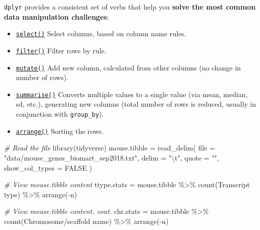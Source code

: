 \documentclass[
]{article}
\newenvironment{Shaded}{}{}
\newcommand{\AttributeTok}[1]{\textcolor[rgb]{0.49,0.56,0.16}{#1}}
\newcommand{\CommentTok}[1]{\textcolor[rgb]{0.38,0.63,0.69}{\textit{#1}}}
\newcommand{\ConstantTok}[1]{\textcolor[rgb]{0.53,0.00,0.00}{#1}}
\newcommand{\FunctionTok}[1]{\textcolor[rgb]{0.02,0.16,0.49}{#1}}
\newcommand{\NormalTok}[1]{#1}
\newcommand{\OtherTok}[1]{\textcolor[rgb]{0.00,0.44,0.13}{#1}}
\newcommand{\SpecialCharTok}[1]{\textcolor[rgb]{0.25,0.44,0.63}{#1}}
\newcommand{\StringTok}[1]{\textcolor[rgb]{0.25,0.44,0.63}{#1}}
\begin{document}
\texttt{dplyr} provides a consistent set of verbs that help you
\textbf{solve the most common data manipulation challenges}:

\begin{itemize}
\item
  \href{https://dplyr.tidyverse.org/reference/select.html}{\texttt{select()}}
  Select columns, based on column name rules.
\item
  \href{https://dplyr.tidyverse.org/reference/filter.html}{\texttt{filter()}}
  Filter rows by rule.
\item
  \href{https://dplyr.tidyverse.org/reference/mutate.html}{\texttt{mutate()}}
  Add new column, calculated from other columns (no change in number of
  rows).
\item
  \href{https://dplyr.tidyverse.org/reference/summarise.html}{\texttt{summarise()}}
  Converts multiple values to a single value (via mean, median, sd,
  etc.), generating new columns (total number of rows is reduced,
  usually in conjunction with \texttt{group\_by}).
\item
  \href{https://dplyr.tidyverse.org/reference/arrange.html}{\texttt{arrange()}}
  Sorting the rows.
\end{itemize}

\begin{Shaded}
\begin{Highlighting}[]
\CommentTok{\# Read the file}
\FunctionTok{library}\NormalTok{(tidyverse)}
\NormalTok{mouse.tibble }\OtherTok{=}
  \FunctionTok{read\_delim}\NormalTok{(}
    \AttributeTok{file =} \StringTok{"data/mouse\_genes\_biomart\_sep2018.txt"}\NormalTok{,}
    \AttributeTok{delim =} \StringTok{"}\SpecialCharTok{\textbackslash{}t}\StringTok{"}\NormalTok{,}
    \AttributeTok{quote =} \StringTok{""}\NormalTok{,}
    \AttributeTok{show\_col\_types =} \ConstantTok{FALSE}
\NormalTok{  )}

\CommentTok{\# View mouse.tibble content}
\NormalTok{ttype.stats }\OtherTok{=}
\NormalTok{  mouse.tibble }\SpecialCharTok{\%\textgreater{}\%}
    \FunctionTok{count}\NormalTok{(}\StringTok{\textasciigrave{}}\AttributeTok{Transcript type}\StringTok{\textasciigrave{}}\NormalTok{) }\SpecialCharTok{\%\textgreater{}\%}
    \FunctionTok{arrange}\NormalTok{(}\SpecialCharTok{{-}}\NormalTok{n)}

\CommentTok{\# View mouse.tibble content, cont.}
\NormalTok{chr.stats }\OtherTok{=}
\NormalTok{  mouse.tibble }\SpecialCharTok{\%\textgreater{}\%}
    \FunctionTok{count}\NormalTok{(}\StringTok{\textasciigrave{}}\AttributeTok{Chromosome/scaffold name}\StringTok{\textasciigrave{}}\NormalTok{) }\SpecialCharTok{\%\textgreater{}\%}
    \FunctionTok{arrange}\NormalTok{(}\SpecialCharTok{{-}}\NormalTok{n)}
\end{Highlighting}
\end{Shaded}
\end{document}
